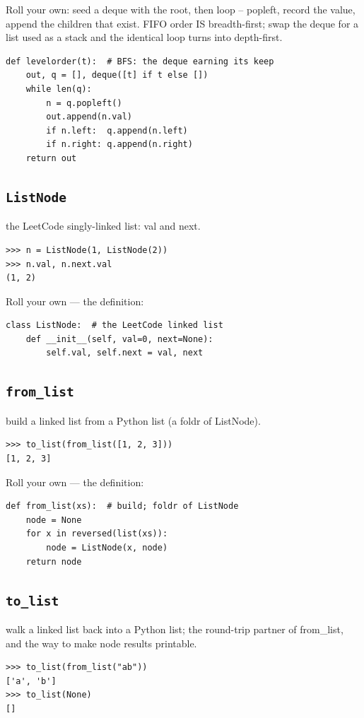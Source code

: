 \documentclass[10pt,letterpaper]{book}
\begin{document}
Roll your own: seed a deque with the root, then loop -- popleft, record the value, append the children that exist. FIFO order IS breadth-first; swap the deque for a list used as a stack and the identical loop turns into depth-first.

\begin{lstlisting}[style=ex]
def levelorder(t):  # BFS: the deque earning its keep
    out, q = [], deque([t] if t else [])
    while len(q):
        n = q.popleft()
        out.append(n.val)
        if n.left:  q.append(n.left)
        if n.right: q.append(n.right)
    return out
\end{lstlisting}
\subsection{\texttt{ListNode}}\label{def:ListNode}
the LeetCode singly-linked list: val and next.
\begin{lstlisting}[style=ex]
>>> n = ListNode(1, ListNode(2))
>>> n.val, n.next.val
(1, 2)
\end{lstlisting}

Roll your own --- the definition:

\begin{lstlisting}[style=ex]
class ListNode:  # the LeetCode linked list
    def __init__(self, val=0, next=None):
        self.val, self.next = val, next
\end{lstlisting}
\subsection{\texttt{from\_list}}\label{def:from-list}
build a linked list from a Python list (a foldr of ListNode).
\begin{lstlisting}[style=ex]
>>> to_list(from_list([1, 2, 3]))
[1, 2, 3]
\end{lstlisting}

Roll your own --- the definition:

\begin{lstlisting}[style=ex]
def from_list(xs):  # build; foldr of ListNode
    node = None
    for x in reversed(list(xs)):
        node = ListNode(x, node)
    return node
\end{lstlisting}

\subsection{\texttt{to\_list}}\label{def:to-list}
walk a linked list back into a Python list; the round-trip partner of from\_list, and the way to make node results printable.
\begin{lstlisting}[style=ex]
>>> to_list(from_list("ab"))
['a', 'b']
>>> to_list(None)
[]
\end{lstlisting}
\end{document}

